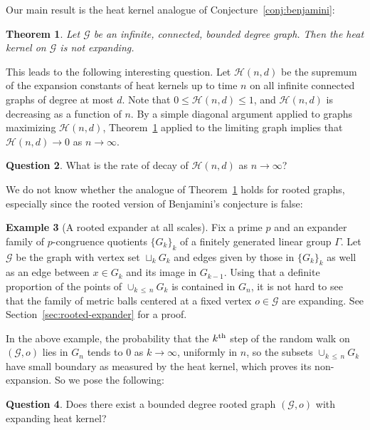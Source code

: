 \documentclass[10pt]{amsart}
\newtheorem{theo}{Theorem}[section]
\theoremstyle{definition}\newtheorem{defi}[theo]{Definition}\newtheorem{rema}[theo]{Remark}\newtheorem{exam}[theo]{Example}\newtheorem{exem}[theo]{Example}\newtheorem{nota}[theo]{Notation}
\newcommand{\calG}{\mathcal{G}}
\newcommand{\scH}{\mathscr{H}}
\newtheorem{ques}[theo]{Question}
\begin{document}
Our main result is the heat kernel analogue of Conjecture~\ref{conj:benjamini}:


\begin{theo}\label{thm:main}
Let $\calG$ be an infinite, connected, bounded degree graph. Then the heat kernel on $\calG$ is not expanding.
\end{theo}


This leads to the following interesting question. Let $\scH(n,d)$ be the supremum of the expansion constants of heat kernels up to time $n$ on all infinite connected graphs of degree at most $d$. Note that $0\leq \scH(n,d)\leq 1$, and $\scH(n,d)$ is decreasing as a function of $n$. By a simple diagonal argument applied to graphs maximizing $\scH(n,d)$, Theorem~\ref{thm:main} applied to the limiting graph implies that $\scH(n,d)\to 0$ as $n\to\infty$.

\begin{ques}
What is the rate of decay of $\scH(n,d)$ as $n\to\infty$?
\end{ques} 

We do not know whether the analogue of Theorem~\ref{thm:main} holds for rooted graphs, especially since the rooted version of Benjamini's conjecture is false:

\begin{exam}[A rooted expander at all scales]\label{ex:rooted_expansion}
Fix a prime $p$ and an expander family of $p$-congruence quotients $\{G_k\}_k$ of a finitely generated linear group $\Gamma$. Let $\calG$ be the graph with vertex set $\sqcup_k G_k$ and edges given by those in $\{G_k\}_k$ as well as an edge between $x\in G_k$ and its image in $G_{k-1}$. Using that a definite proportion of the points of $\cup_{k\,\leq\,n} G_k$ is contained in $G_n$, it is not hard to see that the family of metric balls centered at a fixed vertex $o\in\calG$ are expanding. See Section~\ref{sec:rooted-expander} for a proof.
\end{exam}

In the above example, the probability that the $k^{\rm th}$ step of the random walk on $(\calG, o)$ lies in $G_n$ tends to 0 as $k\to\infty$, uniformly in $n$, so the subsets $\cup_{k\,\leq\,n} G_k$ have small boundary as measured by the heat kernel, which proves its non-expansion. So we pose the following:

\begin{ques}
Does there exist a bounded degree rooted graph $(\calG, o)$ with expanding heat kernel?
\end{ques}
\end{document}
